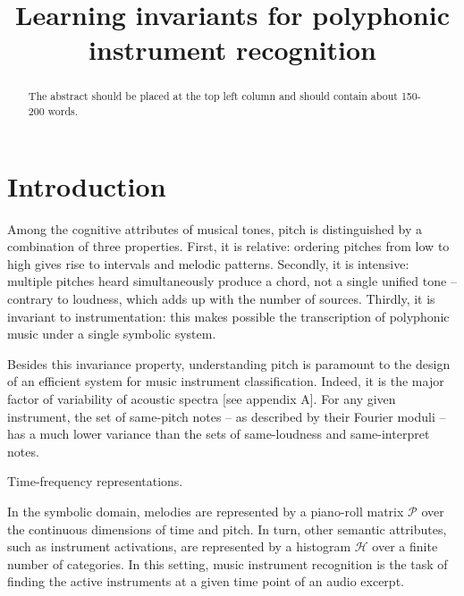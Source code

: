 \documentclass{article}
\title{Learning invariants for polyphonic instrument recognition}
\begin{document}
%
\maketitle
%
\begin{abstract}
The abstract should be placed at the top left column and should contain about 150-200 words.
\end{abstract}
%

\section{Introduction}\label{sec:introduction}
Among the cognitive attributes of musical tones, pitch is distinguished by a combination of three properties.
First, it is relative: ordering pitches from low to high gives rise to intervals and melodic patterns.
Secondly, it is intensive: multiple pitches heard simultaneously produce a chord, not a single unified tone -- contrary to loudness, which adds up with the number of sources.
Thirdly, it is invariant to instrumentation: this makes possible the transcription of polyphonic music under a single symbolic system. 

Besides this invariance property, understanding pitch is paramount to the design of an efficient system for music instrument classification. Indeed, it is the major factor of variability of acoustic spectra [see appendix A]. For any given instrument, the set of same-pitch notes -- as described by their Fourier moduli -- has a much lower variance than the sets of same-loudness and same-interpret notes.

Time-frequency representations.

In the symbolic domain, melodies are represented by a piano-roll matrix $\mathcal{P}$ over the continuous dimensions of time and pitch. In turn, other semantic attributes, such as instrument activations, are represented by a histogram $\mathcal{H}$ over a finite number of categories. 
In this setting, music instrument recognition is the task of finding the active instruments at a given time point of an audio excerpt.


\end{document}
